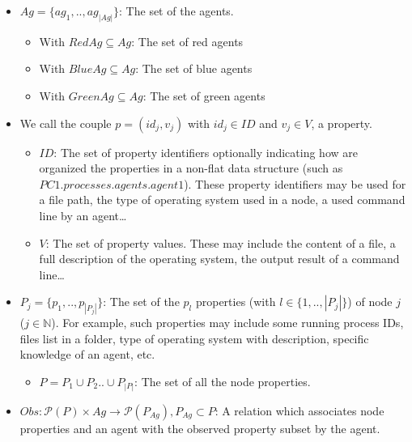 \documentclass[conference]{IEEEtran}
\begin{document}
\begin{itemize}

    \item $Ag = \{ag_1,..,ag_{|Ag|}\}$: The set of the agents.
    \begin{itemize}
        \item With $RedAg \subseteq Ag$: The set of red agents
        \item With $BlueAg \subseteq Ag$: The set of blue agents
        \item With $GreenAg \subseteq Ag$: The set of green agents
    \end{itemize}

    \item We call the couple $p = (id_{j}, v_{j})$ with $id_j \in {ID}$ and $v_j \in V$, a property.
    \begin{itemize}
        \item $ID$: The set of property identifiers optionally indicating how are organized the properties in a non-flat data structure (such as $PC1.processes.agents.agent1$). These property identifiers may be used for a file path, the type of operating system used in a node, a used command line by an agent\dots
        \item $V$: The set of property values. These may include the content of a file, a full description of the operating system, the output result of a command line\dots
    \end{itemize}

    \item $P_{j} = \{ p_1, .., p_{|P_{j}|} \}$: The set of the $p_{l}$ properties (with $l \in \{1,..,|P_{j}|\}$) of node $j$ ($j \in \mathbb{N} $). For example, such properties may include some running process IDs, files list in a folder, type of operating system with description, specific knowledge of an agent, etc.
    \begin{itemize}
        \item $P = P_1 \cup P_2 .. \cup P_{|P|} $: The set of all the node properties.
    \end{itemize}

    \item $Obs: \mathcal{P}(P) \times Ag \rightarrow \mathcal{P}(P_{Ag}), P_{Ag} \subset P$: A relation which associates node properties and an agent with the observed property subset by the agent.
    

\end{itemize}
\end{document}
